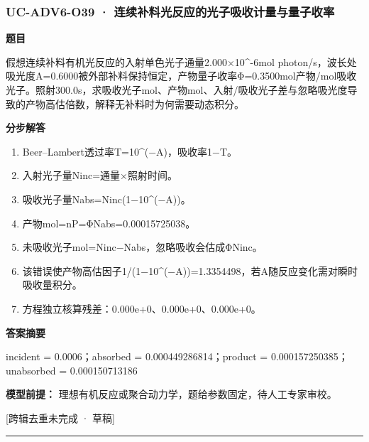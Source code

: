 \documentclass[UTF8,11pt,a4paper]{ctexart}
\begin{document}
\subsubsection*{UC-ADV6-O39 · 连续补料光反应的光子吸收计量与量子收率}
\noindent\textbf{题目}\par
假想连续补料有机光反应的入射单色光子通量2.000×10\textasciicircum{}-6mol photon/s，波长处吸光度A=0.6000被外部补料保持恒定，产物量子收率Φ=0.3500mol产物/mol吸收光子。照射300.0s，求吸收光子mol、产物mol、入射/吸收光子差与忽略吸光度导致的产物高估倍数，解释无补料时为何需要动态积分。\par
\medskip\noindent\textbf{分步解答}
\begin{enumerate}
\item Beer–Lambert透过率T=10\textasciicircum{}(−A)，吸收率1−T。
\item 入射光子量Ninc=通量×照射时间。
\item 吸收光子量Nabs=Ninc(1−10\textasciicircum{}(−A))。
\item 产物mol=nP=ΦNabs=0.00015725038。
\item 未吸收光子mol=Ninc−Nabs，忽略吸收会估成ΦNinc。
\item 该错误使产物高估因子1/(1−10\textasciicircum{}(−A))=1.3354498，若A随反应变化需对瞬时吸收量积分。
\item 方程独立核算残差：0.000e+0、0.000e+0、0.000e+0。
\end{enumerate}
\noindent\textbf{答案摘要}\par
incident = 0.0006；absorbed = 0.000449286814；product = 0.000157250385；unabsorbed = 0.000150713186\par
\noindent\textbf{模型前提：}
理想有机反应或聚合动力学，题给参数固定，待人工专家审校。\par
\noindent\textcolor{red!65!black}{[跨辑去重未完成 · 草稿]} \par
\medskip\hrule\medskip
{}
\end{document}
